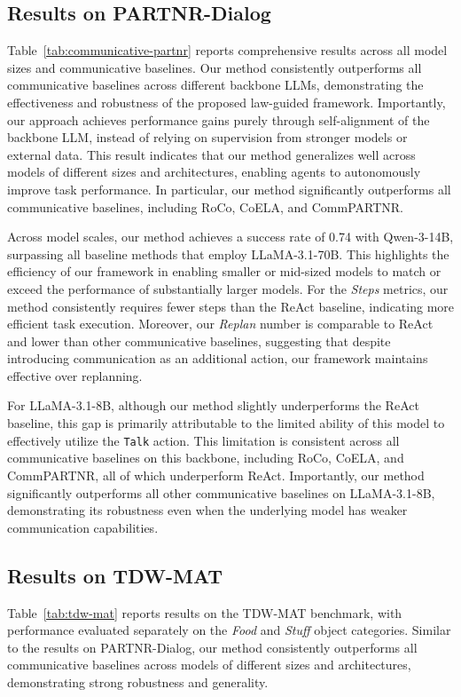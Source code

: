 \documentclass{article}
\theoremstyle{plain}
\theoremstyle{definition}
\theoremstyle{remark}
\begin{document}
\subsection{Results on PARTNR-Dialog}

Table~\ref{tab:communicative-partnr} reports comprehensive results across all model sizes and communicative baselines. Our method consistently outperforms all communicative baselines across different backbone LLMs, demonstrating the effectiveness and robustness of the proposed law-guided framework. Importantly, our approach achieves performance gains purely through self-alignment of the backbone LLM, instead of relying on supervision from stronger models or external data. This result indicates that our method generalizes well across models of different sizes and architectures, enabling agents to autonomously improve task performance. In particular, our method significantly outperforms all communicative baselines, including RoCo, CoELA, and CommPARTNR.

Across model scales, our method achieves a success rate of 0.74 with Qwen-3-14B, surpassing all baseline methods that employ LLaMA-3.1-70B. This highlights the efficiency of our framework in enabling smaller or mid-sized models to match or exceed the performance of substantially larger models. For the \textit{Steps} metrics, our method consistently requires fewer steps than the ReAct baseline, indicating more efficient task execution. Moreover, our \textit{Replan} number is comparable to ReAct and lower than other communicative baselines, suggesting that despite introducing communication as an additional action, our framework maintains effective over replanning.

For LLaMA-3.1-8B, although our method slightly underperforms the ReAct baseline, this gap is primarily attributable to the limited ability of this model to effectively utilize the \texttt{Talk} action. This limitation is consistent across all communicative baselines on this backbone, including RoCo, CoELA, and CommPARTNR, all of which underperform ReAct. Importantly, our method significantly outperforms all other communicative baselines on LLaMA-3.1-8B, demonstrating its robustness even when the underlying model has weaker communication capabilities.

\subsection{Results on TDW-MAT}

Table~\ref{tab:tdw-mat} reports results on the TDW-MAT benchmark, with performance evaluated separately on the \textit{Food} and \textit{Stuff} object categories. Similar to the results on PARTNR-Dialog, our method consistently outperforms all communicative baselines across models of different sizes and architectures, demonstrating strong robustness and generality.
\end{document}
